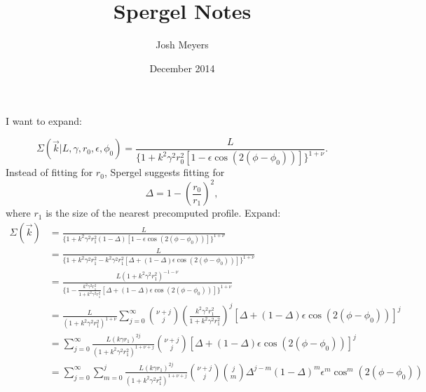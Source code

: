\documentclass{article}
\title{Spergel Notes}
\author{Josh Meyers}
\date{December 2014}
\begin{document}
I want to expand:

\begin{equation}
  \Sigma(\vec{k}|L,\gamma,r_0,\epsilon,\phi_0) = \frac{L}{\{1+k^2\gamma^2r_0^2[1-\epsilon\cos(2(\phi-\phi_0))]\}^{1+\nu}}.
\end{equation}
Instead of fitting for $r_0$, Spergel suggests fitting for
\begin{equation}
  \Delta = 1 - \left(\frac{r_0}{r_1}\right)^2,
\end{equation}
where $r_1$ is the size of the nearest precomputed profile.
Expand:
\begin{equation}
  \begin{split}
    \Sigma(\vec{k}) & = \frac{L}{\{1+k^2\gamma^2r_1^2(1-\Delta)[1-\epsilon\cos(2(\phi-\phi_0))]\}^{1+\nu}} \\
    & = \frac{L}{\{1+k^2\gamma^2r_1^2 - k^2\gamma^2r_1^2[\Delta + (1-\Delta)\epsilon\cos(2(\phi-\phi_0))]\}^{1+\nu}} \\
    & = \frac{L (1+k^2\gamma^2r_1^2)^{-1-\nu}}{\{1 - \frac{k^2\gamma^2r_1^2}{1+k^2\gamma^2r_1^2}\left[\Delta + (1-\Delta)\epsilon\cos(2(\phi-\phi_0))\right]\}^{1+\nu}} \\
    & = \frac{L}{(1+k^2\gamma^2r_1^2)^{1+\nu}}\sum_{j=0}^{\infty}\binom{\nu+j}{j}\left(\frac{k^2\gamma^2r_1^2}{1+k^2\gamma^2r_1^2}\right)^{j}[\Delta + (1-\Delta)\epsilon\cos(2(\phi-\phi_0))]^j \\
    & = \sum_{j=0}^{\infty}\frac{L(k\gamma r_1)^{2j}}{(1+k^2\gamma^2r_1^2)^{1+\nu+j}}\binom{\nu+j}{j}[\Delta + (1-\Delta)\epsilon\cos(2(\phi-\phi_0))]^j \\
    & = \sum_{j=0}^{\infty}\sum_{m=0}^{j}\frac{L(k\gamma r_1)^{2j}}{(1+k^2\gamma^2r_1^2)^{1+\nu+j}}\binom{\nu+j}{j}\binom{j}{m}\Delta^{j-m}(1-\Delta)^m\epsilon^m\cos^m(2(\phi-\phi_0))
  \end{split}
\end{equation}
\end{document}
